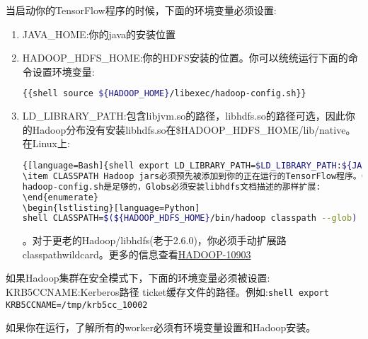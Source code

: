 当启动你的TensorFlow程序的时候，下面的环境变量必须设置:
\begin{enumerate}
\item JAVA\_HOME:你的java的安装位置
\item HADOOP\_HDFS\_HOME:你的HDFS安装的位置。你可以统统运行下面的命令设置环境变量:
\begin{lstlisting}[language=Bash]
{{shell source ${HADOOP_HOME}/libexec/hadoop-config.sh}}
\end{lstlisting}
\item LD\_LIBRARY\_PATH:包含libjvm.so的路径，libhdfs.so的路径可选，因此你的Hadoop分布没有安装libhdfs.so在\$HADOOP\_HDFS\_HOME/lib/native。在Linux上:\begin{lstlisting}[language=Bash]{[language=Bash]{shell export LD_LIBRARY_PATH=$LD_LIBRARY_PATH:${JAVA_HOME}/jre/lib/amd64/server}}
\item CLASSPATH Hadoop jars必须预先被添加到你的正在运行的TensorFlow程序。CLASSPATH设置通过\$\{HADOOP\_HOME\}/libexec/
hadoop-config.sh是足够的，Globs必须安装libhdfs文档描述的那样扩展:
\end{enumerate}
\begin{lstlisting}[language=Python]
shell CLASSPATH=$(${HADOOP_HDFS_HOME}/bin/hadoop classpath --glob) python your_script.py
\end{lstlisting}。对于更老的Hadoop/libhdfs(老于2.6.0)，你必须手动扩展路classpathwildcard。更多的信息查看\href{https://issues.apache.org/jira/browse/HADOOP-10903}{HADOOP-10903}
\end{enumerate}

如果Hadoop集群在安全模式下，下面的环境变量必须被设置:
KRB5CCNAME:Kerberos路径 ticket缓存文件的路径。例如:\lstinline[language=Bash]{shell export KRB5CCNAME=/tmp/krb5cc_10002}

如果你在运行，了解所有的worker必须有环境变量设置和Hadoop安装。